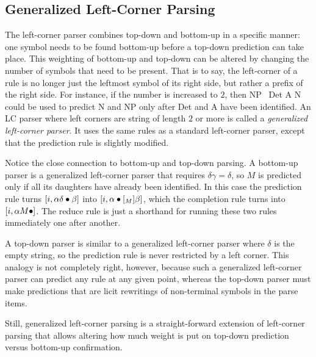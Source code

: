 \subsection{Generalized Left-Corner Parsing}
\label{sub:LeftCorner_Generalized}

The left-corner parser combines top-down and bottom-up in a specific manner: one symbol needs to be found bottom-up before a top-down prediction can take place.
This weighting of bottom-up and top-down can be altered by changing the number of symbols that need to be present.
That is to say, the left-corner of a rule is no longer just the leftmost symbol of its right side, but rather a prefix of the right side.
For instance, if the number is increased to $2$, then NP \rewrite\ Det A N could be used to predict N and NP only after Det and A have been identified.
An LC parser where left corners are string of length $2$ or more is called a \emph{generalized left-corner parser}.
It uses the same rules as a standard left-corner parser, except that the prediction rule is slightly modified.
%
\begin{prooftree}
\end{prooftree}

Notice the close connection to bottom-up and top-down parsing.
A bottom-up parser is a generalized left-corner parser that requires $\delta\gamma = \delta$, so $M$ is predicted only if all its daughters have already been identified.
In this case the prediction rule turns $[i, \alpha \delta \psep \beta]$ into $[i, \alpha \psep [_M] \beta]$, which the completion rule turns into $[i, \alpha M \psep]$.
The reduce rule is just a shorthand for running these two rules immediately one after another.

A top-down parser is similar to a generalized left-corner parser where $\delta$ is the empty string, so the prediction rule is never restricted by a left corner.
This analogy is not completely right, however, because such a generalized left-corner parser can predict any rule at any given point, whereas the top-down parser must make predictions that are licit rewritings of non-terminal symbols in the parse items.

Still, generalized left-corner parsing is a straight-forward extension of left-corner parsing that allows altering how much weight is put on top-down prediction versus bottom-up confirmation.


